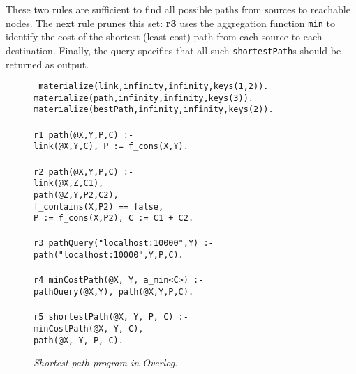 These two rules are sufficient to find all possible paths from sources
to reachable nodes.  The next rule prunes this set: {\bf r3} uses the
aggregation function {\tt min} to identify the cost of the shortest 
(least-cost) path from each source to each destination.  
Finally, the query specifies that all such {\tt shortestPath}s should be 
returned as output.

\begin{figure}
\centering
\begin{boxedminipage}{\linewidth}
\small{\tt
materialize(link,infinity,infinity,keys(1,2)). \\
materialize(path,infinity,infinity,keys(3)). \\
materialize(bestPath,infinity,infinity,keys(2)).\\
\\
r1 path(@X,Y,P,C) :- \\
\datalogspace link(@X,Y,C), P := f\_cons(X,Y). \\
\\
r2 path(@X,Y,P,C) :- \\
\datalogspace link(@X,Z,C1), \\
\datalogspace path(@Z,Y,P2,C2), \\
\datalogspace f\_contains(X,P2) == false, \\
\datalogspace P := f\_cons(X,P2), C := C1 + C2. \\
\\
r3 pathQuery("localhost:10000",Y) :- \\
\datalogspace path("localhost:10000",Y,P,C). \\
\\
r4 minCostPath(@X, Y, a\_min<C>) :- \\
\datalogspace pathQuery(@X,Y), path(@X,Y,P,C). \\
\\
r5 shortestPath(@X, Y, P, C) :- \\
\datalogspace minCostPath(@X, Y, C), \\
\datalogspace path(@X, Y, P, C).
}
\small{\caption{\label{fig:overlogSP}\emph{\small Shortest path program in Overlog}.}}
\end{boxedminipage}
\end{figure}

